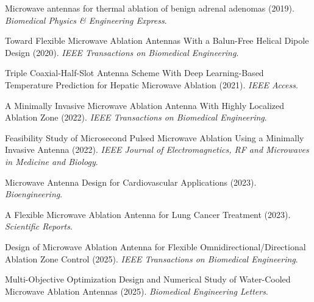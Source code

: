 \documentclass[12pt, a4paper]{article}
\begin{document}
\begin{enumerate}[label={[\arabic*]}]
    \item Microwave antennas for thermal ablation of benign adrenal adenomas (2019). \textit{Biomedical Physics \& Engineering Express}.

    \item Toward Flexible Microwave Ablation Antennas With a Balun-Free Helical Dipole Design (2020). \textit{IEEE Transactions on Biomedical Engineering}.

    \item Triple Coaxial-Half-Slot Antenna Scheme With Deep Learning-Based Temperature Prediction for Hepatic Microwave Ablation (2021). \textit{IEEE Access}.

    \item A Minimally Invasive Microwave Ablation Antenna With Highly Localized Ablation Zone (2022). \textit{IEEE Transactions on Biomedical Engineering}.

    \item Feasibility Study of Microsecond Pulsed Microwave Ablation Using a Minimally Invasive Antenna (2022). \textit{IEEE Journal of Electromagnetics, RF and Microwaves in Medicine and Biology}.

    \item Microwave Antenna Design for Cardiovascular Applications (2023). \textit{Bioengineering}.

    \item A Flexible Microwave Ablation Antenna for Lung Cancer Treatment (2023). \textit{Scientific Reports}.

    \item Design of Microwave Ablation Antenna for Flexible Omnidirectional/Directional Ablation Zone Control (2025). \textit{IEEE Transactions on Biomedical Engineering}.

    \item Multi-Objective Optimization Design and Numerical Study of Water-Cooled Microwave Ablation Antennas (2025). \textit{Biomedical Engineering Letters}.
\end{enumerate}
\end{document}
